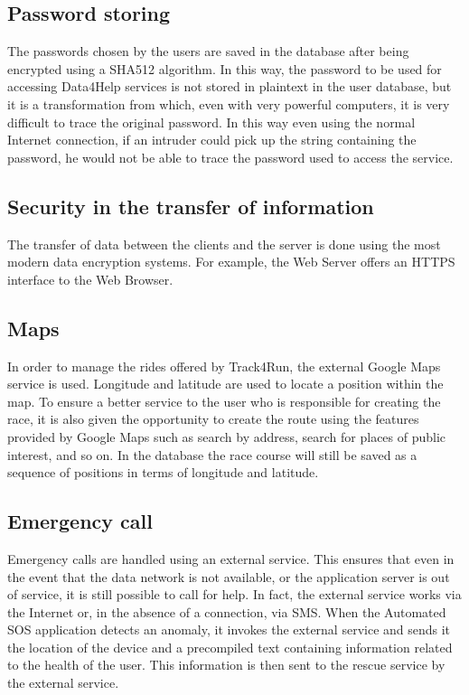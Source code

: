 \subsection{Password storing}
The passwords chosen by the users are saved in the database after being encrypted using a SHA512 algorithm.
In this way, the password to be used for accessing Data4Help services is not stored in plaintext in the user database, but it is a transformation from which, even with very powerful computers, it is very difficult to trace the original password.
In this way even using the normal Internet connection, if an intruder could pick up the string containing the password, he would not be able to trace the password used to access the service.

\subsection{Security in the transfer of information}
The transfer of data between the clients and the server is done using the most modern data encryption systems.
For example, the Web Server offers an HTTPS interface to the Web Browser.

\subsection{Maps}
In order to manage the rides offered by Track4Run, the external Google Maps service is used.
Longitude and latitude are used to locate a position within the map.
To ensure a better service to the user who is responsible for creating the race, it is also given the opportunity to create the route using the features provided by Google Maps such as search by address, search for places of public interest, and so on. In the database the race course will still be saved as a sequence of positions in terms of longitude and latitude.

\subsection{Emergency call}
Emergency calls are handled using an external service.
This ensures that even in the event that the data network is not available, or the application server is out of service, it is still possible to call for help.
In fact, the external service works via the Internet or, in the absence of a connection, via SMS.
When the Automated SOS application detects an anomaly, it invokes the external service and sends it the location of the device and a precompiled text containing information related to the health of the user.
This information is then sent to the rescue service by the external service.
